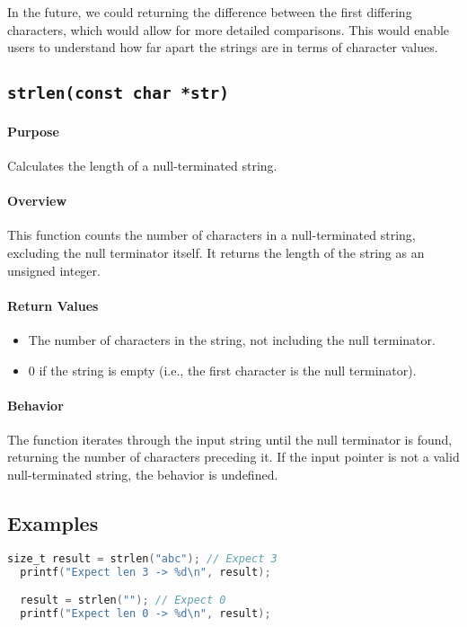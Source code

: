 \begin{note}
In the future, we could returning the difference between the first differing 
characters, which would allow for more detailed comparisons. This would enable 
users to understand how far apart the strings are in terms of character values.
\end{note}

\subsection{\texttt{strlen(const char *str)}}

\paragraph{Purpose}
Calculates the length of a null-terminated string.

\paragraph{Overview}
This function counts the number of characters in a null-terminated string,
excluding the null terminator itself. It returns the length of the string as an
unsigned integer.

\paragraph{Return Values}
\begin{itemize}
    \item The number of characters in the string, not including the null terminator.
    \item 0 if the string is empty (i.e., the first character is the null terminator).
\end{itemize}

\paragraph{Behavior}
The function iterates through the input string until the null terminator is found, returning 
the number of characters preceding it. If the input pointer is not a valid 
null-terminated string, the behavior is undefined.

\subsection*{Examples}
\begin{lstlisting}[language=C, caption=String Length Example]
  size_t result = strlen("abc"); // Expect 3
  printf("Expect len 3 -> %d\n", result);

  result = strlen(""); // Expect 0
  printf("Expect len 0 -> %d\n", result);
\end{lstlisting}
